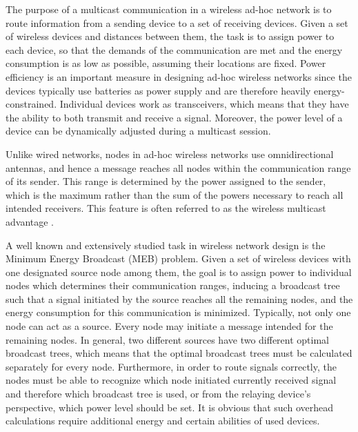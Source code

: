 \label{intro}

The purpose of a multicast communication in a wireless ad-hoc network is to route information from a sending device to a set of receiving devices. Given a set of wireless devices and distances between them, the task is to assign power to each device, so that the demands of the communication are met and the energy consumption is as low as possible, assuming their locations are fixed. Power efficiency is an important measure in designing ad-hoc wireless networks since the devices typically use batteries as power supply and are therefore heavily energy-constrained. Individual devices work as transceivers, which means that they have the ability to both transmit and receive a signal. Moreover, the power level of a device can be dynamically adjusted during a multicast session.

Unlike wired networks, nodes in ad-hoc wireless networks use omnidirectional antennas, and hence a message reaches all nodes within the communication range of its sender. This range is determined by the power assigned to the sender, which is the maximum rather than the sum of the powers necessary to reach all intended receivers. This feature is often referred to as the wireless multicast advantage \cite{Wieseltier00onthe}. 

A well known and extensively studied task in wireless network design is the Minimum Energy Broadcast (MEB) problem. Given a set of wireless devices with one designated source node among them, the goal is to assign power to individual nodes  which determines their communication ranges, inducing a broadcast tree such that a signal initiated by the source reaches all the remaining nodes, and the energy consumption for this communication is minimized. Typically, not only one node can act as a source. Every node may initiate a message intended for the remaining nodes. In general, two different sources have two different optimal broadcast trees, which means that the optimal broadcast trees must be calculated separately for every node. Furthermore, in order to route signals correctly, the nodes must be able to recognize which node initiated currently received signal and therefore which broadcast tree is used, or from the relaying device's perspective, which power level should be set. It is obvious that such overhead calculations require additional energy and certain abilities of used devices.

